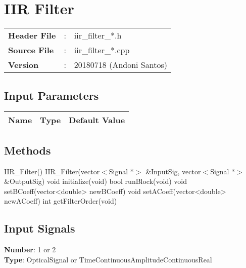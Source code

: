 \clearpage

\section{IIR Filter}

\begin{refsection}

\begin{tcolorbox}	
	\begin{tabular}{p{2.75cm} p{0.2cm} p{10.5cm}} 	
		\textbf{Header File}   &:& iir\_filter\_*.h \\
		\textbf{Source File}   &:& iir\_filter\_*.cpp \\
		\textbf{Version}	   &:& 20180718 (Andoni Santos)
	\end{tabular}
\end{tcolorbox}

\subsection*{Input Parameters}

\begin{table}[H]
	\centering
	\begin{tabular}{|l|l|l|}
		\hline
		\textbf{Name}  		 & \textbf{Type}  & \textbf{Default Value}    	\\\hline
	\end{tabular}
\end{table}


\subsection*{Methods}
IIR\_Filter() {}
\bigbreak
IIR\_Filter(vector$<$Signal *$>$ \&InputSig, vector$<$Signal *$>$ \&OutputSig){}
\bigbreak
void initialize(void)
\bigbreak
bool runBlock(void)
\bigbreak
void setBCoeff(vector<double> newBCoeff)
\bigbreak
void setACoeff(vector<double> newACoeff)
\bigbreak
int getFilterOrder(void)

\subsection*{Input Signals}

\textbf{Number}: 1 or 2\\
\textbf{Type}: OpticalSignal or TimeContinuousAmplitudeContinuousReal


\end{refsection}
